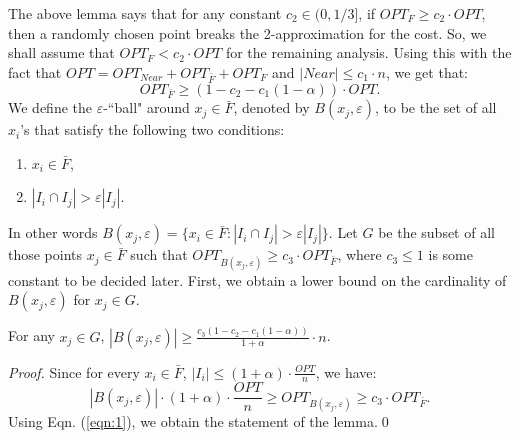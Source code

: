 \documentclass[11pt]{llncs}
\newcommand{\veps}{\varepsilon}
\begin{document}
The above lemma says that for any constant $c_2 \in (0, 1/3]$, if $OPT_F \geq c_2 \cdot OPT$, then a randomly chosen point breaks the 2-approximation for the cost. 
So, we shall assume that $OPT_F < c_2 \cdot OPT$ for the remaining analysis. Using this with the fact that $OPT = OPT_{Near} + OPT_{\bar{F}} + OPT_F$ and $|Near| \leq c_1 \cdot n$, we get that:
\begin{equation}\label{eqn:1}
OPT_{\bar{F}} \geq (1 - c_2 - c_1(1-\alpha)) \cdot OPT.
\end{equation}
We define the $\veps$-``ball" around $x_j \in \bar{F}$, denoted by $B(x_j, \veps)$, to be the set of all $x_i$'s that satisfy the following two conditions:
\begin{enumerate}
\item $x_i \in \bar{F}$,
\item $|I_i \cap I_j| > \veps |I_j|$.
\end{enumerate}




In other words $B(x_j, \veps) = \{x_i \in \bar{F} : |I_i \cap I_j| > \veps |I_j|\}$.
Let $G$ be the subset of all those points $x_j \in \bar{F}$ such that $OPT_{B(x_j, \veps)} \geq c_3 \cdot OPT_{\bar{F}}$, where $c_3 \leq 1$ is some constant to be decided later.  
First, we obtain a lower bound on the cardinality of $B(x_j, \veps)$ for $x_j \in G$.

\begin{lemma}\label{lemma:3}
For any $x_j \in G$, $|B(x_j, \veps)| \geq \frac{c_3(1 - c_2 - c_1(1-\alpha))}{1+\alpha} \cdot n$.
\end{lemma}
\begin{proof}
Since for every $x_i \in \bar{F}$, $|I_i| \leq (1+\alpha)\cdot \frac{OPT}{n}$, we have:
$$
|B(x_j, \veps)| \cdot (1+\alpha) \cdot \frac{OPT}{n} \geq OPT_{B(x_j, \veps)} \geq c_3 \cdot OPT_{\bar{F}}.
$$
Using Eqn. (\ref{eqn:1}), we obtain the statement of the lemma.\qed
\end{proof}
\end{document}

